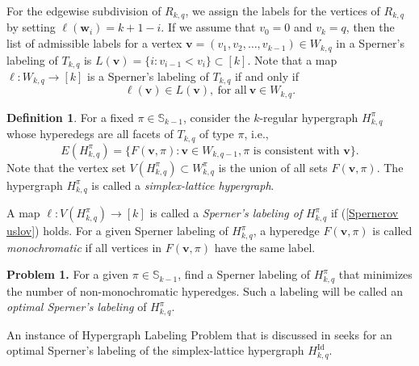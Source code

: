 \documentclass{birkjour}
\theoremstyle{definition}
\newtheorem{defn}[thm]{Definition}
\theoremstyle{remark}
\numberwithin{equation}{section}
\begin{document}
For the edgewise subdivision of $R_{k,q}$, we assign the labels
for the vertices of $R_{k,q}$ by setting
$\ell(\mathbf{w}_i)=k+1-i$. If we assume that $v_0=0$ and $v_k=q$,
then the list of admissible labels for a vertex
$\mathbf{v}=(v_1,v_2,\ldots,v_{k-1})\in W_{k,q}$ in a Sperner's
labeling of $T_{k,q}$ is $L(\textbf{v})=\{i:v_{i-1}<v_i\}\subset
[k]$. Note that a map $\ell: W_{k,q}\rightarrow [k]$ is a
Sperner's labeling of $T_{k,q}$ if and only if
\begin{equation}\label{Spernerov uslov}
\ell(\textbf{v})\in L(\textbf{v}),\ \text{for all}\ \textbf{v}\in
W_{k,q}.
\end{equation}



 \begin{defn} For a fixed $\pi\in \mathbb{S}_{k-1}$, consider
 the $k$-regular hypergraph $H^{\pi}_{k,q}$ whose hyperedegs are
 all facets of $T_{k,q}$ of type $\pi$, i.e.,
 $$E(H^\pi_{k,q})=\{F(\mathbf{v},\pi):\mathbf{v}\in W_{k,q-1},
  \pi\textrm{ is consistent with }\mathbf{v}\}.$$
Note that the vertex set $V(H_{k,q}^\pi)\subset W^\pi_{k,q}$ is
the union of all sets $F(\mathbf{v},\pi)$. The hypergraph
$H_{k,q}^\pi$ is called a \emph{simplex-lattice hypergraph}.

A map $\ell: V(H_{k,q}^\pi)\to[k]$ is called a \emph{Sperner's labeling
of} $H_{k,q}^\pi$ if (\ref{Spernerov uslov}) holds. For a given
Sperner labeling of $H_{k,q}^\pi$, a hyperedge
$F(\mathbf{v}, \pi)$ is called \emph{monochromatic} if all
vertices in $F(\mathbf{v}, \pi)$ have the same label.
\end{defn}

\textbf{Problem 1.} For a given $\pi\in \mathbb{S}_{k-1}$, find a
Sperner labeling of $H^\pi_{k,q}$ that minimizes the number of
non-monochromatic hyperedges. Such a labeling will be called an
\emph{optimal Sperner's labeling} of $H_{k,q}^\pi$.




An instance of Hypergraph Labeling Problem that is discussed in
\cite{M-V} seeks for an optimal Sperner's labeling of the
simplex-lattice hypergraph $H_{k,q}^{\mathrm{Id}}$.
\end{document}
